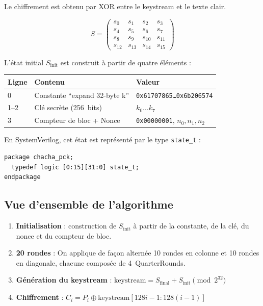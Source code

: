 \documentclass[12pt, a4paper]{article}
\newcommand{\signal}[1]{\texttt{#1}}
\begin{document}
Le chiffrement est obtenu par XOR entre le keystream et le texte clair.

\[
S =
\begin{pmatrix}
s_0  & s_1  & s_2  & s_3  \\
s_4  & s_5  & s_6  & s_7  \\
s_8  & s_9  & s_{10} & s_{11} \\
s_{12} & s_{13} & s_{14} & s_{15}
\end{pmatrix}
\]

L'état initial $S_{\text{init}}$ est construit à partir de quatre éléments :

\begin{center}
\begin{tabular}{lll}
  \toprule
  \textbf{Ligne} & \textbf{Contenu} & \textbf{Valeur} \\
  \midrule
  0   & Constante ``expand 32-byte k'' & \texttt{0x61707865\ldots0x6b206574} \\
  1--2 & Clé secrète (256~bits) & $k_0 \ldots k_7$ \\
  3   & Compteur de bloc + Nonce & \texttt{0x00000001}, $n_0, n_1, n_2$ \\
  \bottomrule
\end{tabular}
\end{center}

En SystemVerilog, cet état est représenté par le type \signal{state\_t} :

\begin{lstlisting}[caption={Type \texttt{state\_t} dans \texttt{chacha\_pck.sv}}]
package chacha_pck;
  typedef logic [0:15][31:0] state_t;
endpackage
\end{lstlisting}

\subsection{Vue d'ensemble de l'algorithme}

\begin{tcolorbox}[defbox, title={Processus de chiffrement ChaCha20}]
\begin{enumerate}
  \item \textbf{Initialisation} : construction de $S_{\text{init}}$ à partir de la constante, de
        la clé, du nonce et du compteur de bloc.
  \item \textbf{20 rondes} : On applique de façon alternée 10 rondes en colonne et 10 rondes en
        diagonale, chacune composée de 4~QuarterRounds.
  \item \textbf{Génération du keystream} :
        $\text{keystream} = S_{\text{final}} + S_{\text{init}} \pmod{2^{32}}$
  \item \textbf{Chiffrement} : $C_i = P_i \oplus \text{keystream}[128i-1 : 128(i-1)]$
\end{enumerate}
\end{tcolorbox}
\end{document}
